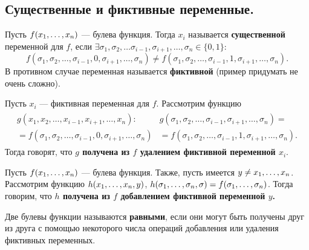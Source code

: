 \subsection{Существенные и фиктивные переменные.} 
\begin{df}
	Пусть $f(x_1, \ldots, x_n)$ --- булева функция. 
	Тогда $x_i$ называется \textbf{существенной} переменной для $f$,
	если $\exists {\sigma_1, \sigma_2, \ldots \sigma_{i-1}, \sigma_{i+1}, \ldots, \sigma_{n}} \in \{ 0,1 \}:$
	$$
		f( \sigma_1, \sigma_2, \ldots, \sigma_{i-1}, 0, \sigma_{i+1}, \ldots, \sigma_{n})
		\neq f(\sigma_1, \sigma_2, \ldots, \sigma_{i-1}, 1, \sigma_{i+1}, \ldots, \sigma_{n}).
	$$
	В противном случае переменная называется \textbf{фиктивной}
	(пример придумать не очень сложно).
\end{df}

\begin{df}
	Пусть $x_i$ --- фиктивная переменная для $f$.
	Рассмотрим функцию
	\begin{gather*}
		\begin{split}
			g(x_1, x_2, \ldots, x_{i-1}, x_{i+1}, \ldots, x_{n})\colon &
			g(\sigma_1, \sigma_2, \ldots, \sigma_{i-1}, \sigma_{i+1}, \ldots, \sigma_{n}) = \\
			= f(\sigma_1, \sigma_2, \ldots, \sigma_{i-1}, 0, \sigma_{i+1}, \ldots, \sigma_{n})
			&= f(\sigma_1, \sigma_2, \ldots, \sigma_{i-1}, 1, \sigma_{i+1}, \ldots, \sigma_{n}).
		\end{split}
	\end{gather*}
	Тогда говорят, что \textbf{$g$ получена из $f$ удалением фиктивной переменной $x_i$}.
\end{df}

\begin{df}
	Пусть $f(x_1, \ldots, x_n)$ --- булева функция.
	Также, пусть имеется $y \neq x_1, \ldots, x_n $.
	Рассмотрим функцию $h(x_1, \ldots, x_n, y)$, $h(\sigma_1, \ldots, \sigma_n, \sigma) = f(\sigma_1, \ldots, \sigma_n)$.
	Тогда говорим, что \textbf{$h$ получена из $f$ добавлением фиктивной переменной  $y$.}
\end{df}

\begin{df}
	Две булевы функции называются \textbf{равными},
	если они могут быть получены друг из друга с помощью
	некоторого числа операций добавления или удаления фиктивных переменных. \\
\end{df}


